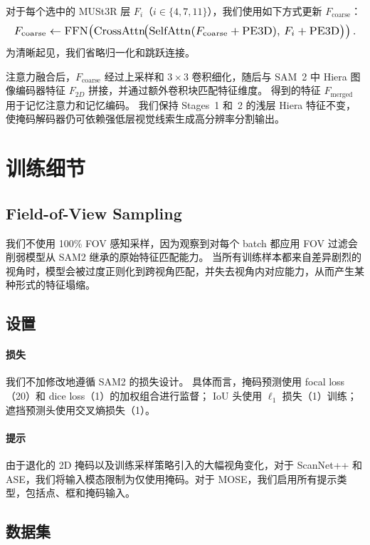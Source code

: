 对于每个选中的 MUSt3R 层 $F_i$（$i \in \{4,7,11\}$），我们使用如下方式更新 $F_{\text{coarse}}$：
\begin{equation} \small
\resizebox{\columnwidth}{!}{$
F_{\text{coarse}}
\leftarrow
\mathrm{FFN}\!\left(
\mathrm{CrossAttn}\!\big(
\mathrm{SelfAttn}(F_{\text{coarse}} + \mathrm{PE3D}),
\, F_i + \mathrm{PE3D}
\big)\right).
$}
\end{equation}
为清晰起见，我们省略归一化和跳跃连接。

注意力融合后，$F_{\text{coarse}}$ 经过上采样和 $3\!\times\!3$ 卷积细化，随后与 SAM~2 中 Hiera 图像编码器特征 $F_{2D}$ 拼接，并通过额外卷积块匹配特征维度。
得到的特征 $F_{\text{merged}}$ 用于记忆注意力和记忆编码。
我们保持 Stages~1 和~2 的浅层 Hiera 特征不变，使掩码解码器仍可依赖强低层视觉线索生成高分辨率分割输出。


\section{训练细节} \label{sec:training_details}
\subsection{Field-of-View Sampling}
我们不使用 100\% FOV 感知采样，因为观察到对每个 batch 都应用 FOV 过滤会削弱模型从 SAM2 继承的原始特征匹配能力。
当所有训练样本都来自差异剧烈的视角时，模型会被过度正则化到跨视角匹配，并失去视角内对应能力，从而产生某种形式的特征塌缩。  



\subsection{设置}

\paragraph{损失}
我们不加修改地遵循 SAM2 的损失设计。
具体而言，掩码预测使用 focal loss（20）和 dice loss（1）的加权组合进行监督；
IoU 头使用 $\ell_{1}$ 损失（1）训练；
遮挡预测头使用交叉熵损失（1）。

\paragraph{提示}
由于退化的 2D 掩码以及训练采样策略引入的大幅视角变化，对于 ScanNet++ 和 ASE，我们将输入模态限制为仅使用掩码。对于 MOSE，我们启用所有提示类型，包括点、框和掩码输入。

\subsection{数据集}

